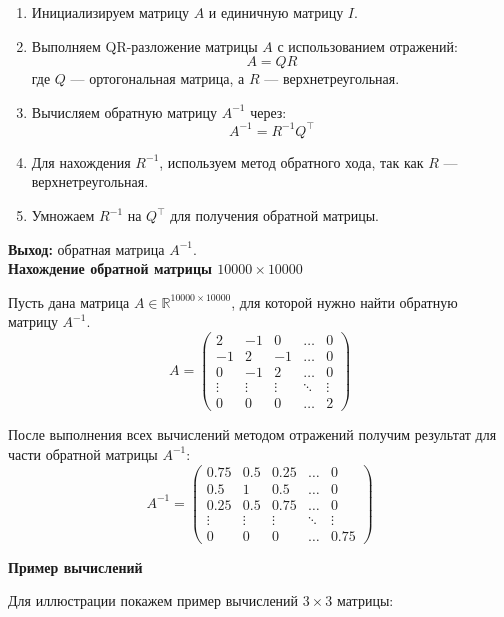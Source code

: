 \documentclass[14pt]{report}
\begin{document}
\begin{enumerate}
    \item Инициализируем матрицу \( A \) и единичную матрицу \( I \).
    
    \item Выполняем QR-разложение матрицы \( A \) с использованием отражений:
    \[
    A = QR
    \]
    где \( Q \) — ортогональная матрица, а \( R \) — верхнетреугольная.

    \item Вычисляем обратную матрицу \( A^{-1} \) через:
    \[
    A^{-1} = R^{-1} Q^\top
    \]
    
    \item Для нахождения \( R^{-1} \), используем метод обратного хода, так как \( R \) — верхнетреугольная.
    
    \item Умножаем \( R^{-1} \) на \( Q^\top \) для получения обратной матрицы.
\end{enumerate}

\textbf{Выход:} обратная матрица \( A^{-1} \).\\

\textbf{Нахождение обратной матрицы \( 10000 \times 10000 \)}

Пусть дана матрица \( A \in \mathbb{R}^{10000 \times 10000} \), для которой нужно найти обратную матрицу \( A^{-1} \).
\[
A = \begin{pmatrix}
2 & -1 & 0 & \dots & 0 \\
-1 & 2 & -1 & \dots & 0 \\
0 & -1 & 2 & \dots & 0 \\
\vdots & \vdots & \vdots & \ddots & \vdots \\
0 & 0 & 0 & \dots & 2
\end{pmatrix}
\]

После выполнения всех вычислений методом отражений получим результат для части обратной матрицы \( A^{-1} \):
\[
A^{-1} = \begin{pmatrix}
0.75 & 0.5 & 0.25 & \dots & 0 \\
0.5 & 1 & 0.5 & \dots & 0 \\
0.25 & 0.5 & 0.75 & \dots & 0 \\
\vdots & \vdots & \vdots & \ddots & \vdots \\
0 & 0 & 0 & \dots & 0.75
\end{pmatrix}
\]

\textbf{Пример вычислений}

Для иллюстрации покажем пример вычислений \( 3 \times 3 \) матрицы:
\end{document}
